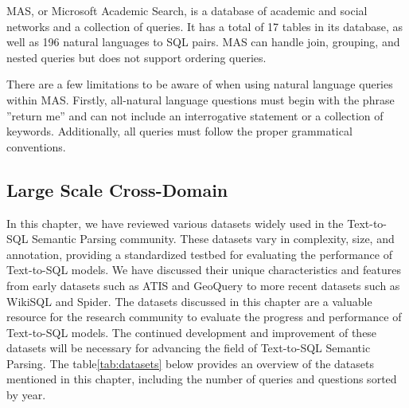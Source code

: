 MAS, or Microsoft Academic Search\cite{roy2013the}, is a database of academic and social networks and a collection of queries. It has a total of 17 tables in its database, as well as 196 natural languages to SQL pairs. MAS can handle join, grouping, and nested queries but does not support ordering queries.

There are a few limitations to be aware of when using natural language queries within MAS. Firstly, all-natural language questions must begin with the phrase ”return me” and can not include an interrogative statement or a collection of keywords. Additionally, all queries must follow the proper grammatical conventions.

\clearpage

\subsection{Large Scale Cross-Domain}







In this chapter, we have reviewed various datasets widely used in the Text-to-SQL Semantic Parsing community. These datasets vary in complexity, size, and annotation, providing a standardized testbed for evaluating the performance of Text-to-SQL models. We have discussed their unique characteristics and features from early datasets such as ATIS and GeoQuery to more recent datasets such as WikiSQL and Spider.
The datasets discussed in this chapter are a valuable resource for the research community to evaluate the progress and performance of Text-to-SQL models. The continued development and improvement of these datasets will be necessary for advancing the field of Text-to-SQL Semantic Parsing.
The table\ref{tab:datasets} below provides an overview of the datasets mentioned in this chapter, including the number of queries and questions sorted by year.


